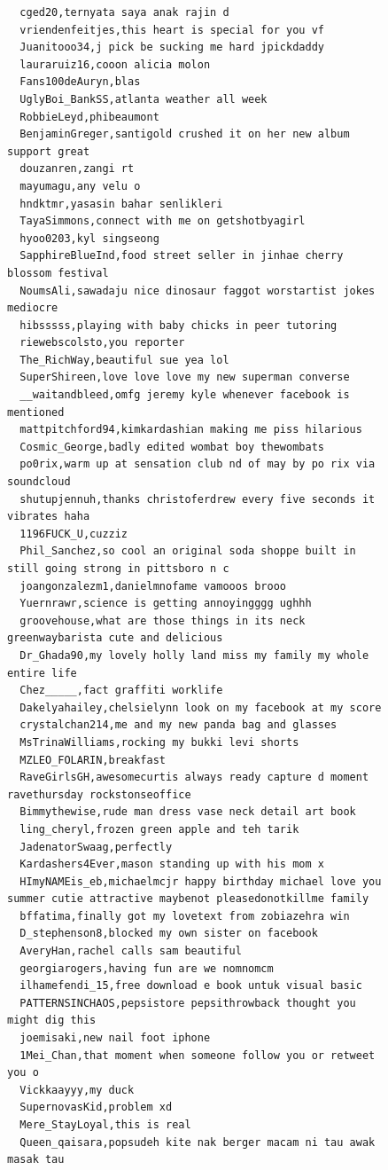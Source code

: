 \begin{figure}[htpb]
\begin{verbatim}
  cged20,ternyata saya anak rajin d
  vriendenfeitjes,this heart is special for you vf
  Juanitooo34,j pick be sucking me hard jpickdaddy
  lauraruiz16,cooon alicia molon
  Fans100deAuryn,blas
  UglyBoi_BankSS,atlanta weather all week
  RobbieLeyd,phibeaumont
  BenjaminGreger,santigold crushed it on her new album support great
  douzanren,zangi rt
  mayumagu,any velu o
  hndktmr,yasasin bahar senlikleri
  TayaSimmons,connect with me on getshotbyagirl
  hyoo0203,kyl singseong
  SapphireBlueInd,food street seller in jinhae cherry blossom festival
  NoumsAli,sawadaju nice dinosaur faggot worstartist jokes mediocre
  hibsssss,playing with baby chicks in peer tutoring
  riewebscolsto,you reporter
  The_RichWay,beautiful sue yea lol
  SuperShireen,love love love my new superman converse
  __waitandbleed,omfg jeremy kyle whenever facebook is mentioned
  mattpitchford94,kimkardashian making me piss hilarious
  Cosmic_George,badly edited wombat boy thewombats
  po0rix,warm up at sensation club nd of may by po rix via soundcloud
  shutupjennuh,thanks christoferdrew every five seconds it vibrates haha
  1196FUCK_U,cuzziz
  Phil_Sanchez,so cool an original soda shoppe built in still going strong in pittsboro n c
  joangonzalezm1,danielmnofame vamooos brooo
  Yuernrawr,science is getting annoyingggg ughhh
  groovehouse,what are those things in its neck greenwaybarista cute and delicious
  Dr_Ghada90,my lovely holly land miss my family my whole entire life
  Chez_____,fact graffiti worklife
  Dakelyahailey,chelsielynn look on my facebook at my score
  crystalchan214,me and my new panda bag and glasses
  MsTrinaWilliams,rocking my bukki levi shorts
  MZLEO_FOLARIN,breakfast
  RaveGirlsGH,awesomecurtis always ready capture d moment ravethursday rockstonseoffice
  Bimmythewise,rude man dress vase neck detail art book
  ling_cheryl,frozen green apple and teh tarik
  JadenatorSwaag,perfectly
  Kardashers4Ever,mason standing up with his mom x
  HImyNAMEis_eb,michaelmcjr happy birthday michael love you summer cutie attractive maybenot pleasedonotkillme family
  bffatima,finally got my lovetext from zobiazehra win
  D_stephenson8,blocked my own sister on facebook
  AveryHan,rachel calls sam beautiful
  georgiarogers,having fun are we nomnomcm
  ilhamefendi_15,free download e book untuk visual basic
  PATTERNSINCHAOS,pepsistore pepsithrowback thought you might dig this
  joemisaki,new nail foot iphone
  1Mei_Chan,that moment when someone follow you or retweet you o
  Vickkaayyy,my duck
  SupernovasKid,problem xd
  Mere_StayLoyal,this is real
  Queen_qaisara,popsudeh kite nak berger macam ni tau awak masak tau

\end{verbatim}
\end{figure}
